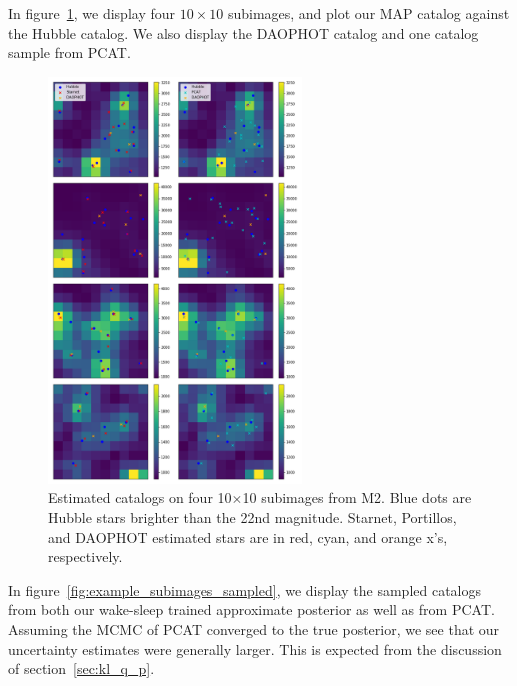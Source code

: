 In figure~\ref{fig:example_subimages}, we display four $10\times10$ subimages, and plot
our MAP catalog against the Hubble catalog. We also display the DAOPHOT catalog and one catalog sample from PCAT.

\begin{figure}[h]
    \centering
    \includegraphics[width=0.6\textwidth]{figures/example_subimages.png}
    \caption{Estimated catalogs on four 10$\times$10 subimages from
    M2. Blue dots are Hubble stars brighter than the 22nd magnitude.
    Starnet, Portillos, and DAOPHOT estimated stars are in
    red, cyan, and orange x's, respectively. }
    \label{fig:example_subimages}
\end{figure}


In figure~\ref{fig:example_subimages_sampled}, we display the sampled catalogs from both our 
wake-sleep trained approximate posterior as well as from PCAT. Assuming the MCMC
of PCAT converged to the true posterior, we see that our uncertainty estimates
were generally larger. This is expected from the discussion of section~\ref{sec:kl_q_p}. 

